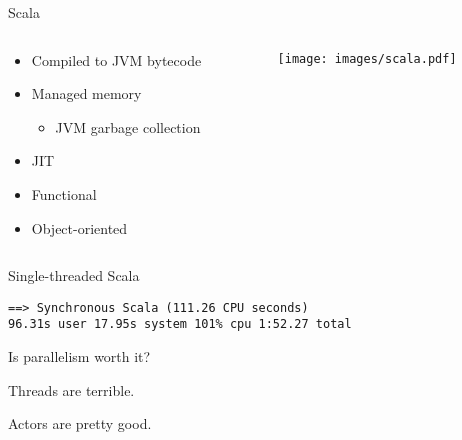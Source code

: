\documentclass[aspectratio=169,14pt]{beamer}
\newcommand{\megatext}[1]{
  \begin{center}
    \Huge
    #1
  \end{center}
}
\begin{document}
\begin{frame}{Scala}
  \begin{columns}[c]
    \begin{column}{0.6\textwidth}
      \begin{itemize}
      \item Compiled to JVM bytecode
      \item Managed memory
        \begin{itemize}
          \item JVM garbage collection
        \end{itemize}
      \item JIT
      \item Functional
      \item Object-oriented
      \end{itemize}
    \end{column}

    \begin{column}{0.4\textwidth}
      \begin{figure}
        \texttt{[image: images/scala.pdf]}
      \end{figure}
    \end{column}
  \end{columns}
\end{frame}


\begin{frame}[fragile]{Single-threaded Scala}
  \begin{verbatim}
==> Synchronous Scala (111.26 CPU seconds)
96.31s user 17.95s system 101% cpu 1:52.27 total
  \end{verbatim}
\end{frame}


\begin{frame}
  \megatext{Is parallelism worth it?}
\end{frame}

\begin{frame}
  \megatext{Threads are terrible.}
\end{frame}


\begin{frame}
  \megatext{Actors are pretty good.}
\end{frame}
\end{document}
